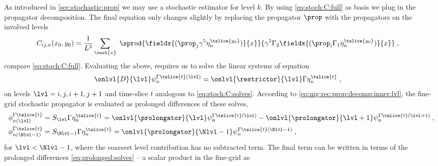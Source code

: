 As introduced in \cref{sec:stochastic:prop} we may use a stochastic estimator for level $k$.
By using \cref{eq:stoch:C:full} as basis we plug in the propagator decomposition.
The final equation only changes slightly by replacing the propagator $\prop$ with the propagators on the involved levels
\begin{align}
C_{ij,n}(x_0, y_0)
&= \frac{1}{L^{3}} \sum_{\vect{x}} \;
\sprod{
	\fieldx{(\prop_j \gamma^{5} \eta_n^{\tslice{y_0}})}{x}
}{
	\gamma^{5}
	\Gamma_2
	\fieldx{(\prop_i \Gamma_1 \eta_n^{\tslice{y_0}})}{x}
} \;,
\end{align}
compare \cref{eq:stoch:C:full}.
Evaluating the above, requires us to solve the linear systems of equation
\begin{align}
\onlvl{D}{\lvl  }
\psi_{n}^{\Gamma \tslice{t} (\lvl)} &=
\onlvl{\mathcal{\restrictor}}{\lvl  }
\Gamma \eta_n^{\tslice{t}} \;,
\end{align}
on levels $\lvl = i, j, i+1, j+1$ and time-slice $t$ analogous to \cref{eq:stoch:C:solves}.
According to \cref{eq:mg:rec:prop:decomp:inner:lvl}, the fine-grid stochastic propagator is evaluated as prolonged differences of these solves,
\begin{align} \label{eq:prolonged:solves}
\phi_{n(\lvl)}^{\Gamma \tslice{t}}
&= S_{\lvl} \Gamma \eta_n^{\tslice{t}}
= \onlvl{\mathcal{\prolongator}}{\lvl  }
	\psi_{n}^{\Gamma \tslice{t} (\lvl)}
- \onlvl{\mathcal{\prolongator}}{\lvl+1}
	\psi_{n}^{\Gamma \tslice{t} (\lvl+1)} \;, \\
\phi_{n(\Nlvl-1)}^{\Gamma \tslice{t}}
&= S_{\Nlvl-1} \Gamma \eta_n^{\tslice{t}}
= \onlvl{\mathcal{\prolongator}}{\Nlvl-1  }
	\psi_{n}^{\Gamma \tslice{t} (\Nlvl-1)} \;,
\end{align}
for $\lvl < \Nlvl-1$, where the coarsest level contribution has no subtracted term.
The final term can be written in terms of the prolonged differences \cref{eq:prolonged:solves} -- a scalar product in the fine-grid as
